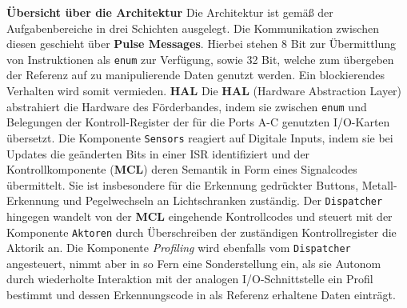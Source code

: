 \documentclass[
   draft=false
  ,paper=a4
  ,twoside=true
  ,fontsize=11pt
  ,headsepline
  ,DIV11
  ,parskip=full+
]{scrartcl} %
\begin{document}
\textbf{Übersicht über die Architektur} \newline
Die Architektur ist gemäß der Aufgabenbereiche in drei Schichten ausgelegt. Die Kommunikation zwischen diesen geschieht über \textbf{Pulse Messages}. Hierbei stehen 8 Bit zur Übermittlung von Instruktionen als \texttt{enum} zur Verfügung, sowie 32 Bit, welche zum übergeben der Referenz auf zu manipulierende Daten genutzt werden. Ein blockierendes Verhalten wird somit vermieden.
\newline
\newline
\textbf{HAL}\newline
Die \textbf{HAL} (Hardware Abstraction Layer) abstrahiert die Hardware des Förderbandes, indem sie zwischen \texttt{enum} und Belegungen der Kontroll-Register der für die Ports A-C genutzten I/O-Karten übersetzt. 
Die Komponente \texttt{Sensors} reagiert auf Digitale Inputs, indem sie bei Updates die geänderten Bits in einer ISR identifiziert und der Kontrollkomponente (\textbf{MCL}) deren Semantik in Form eines Signalcodes übermittelt. Sie ist insbesondere für die Erkennung gedrückter Buttons, Metall-Erkennung und Pegelwechseln an Lichtschranken zuständig.
Der \texttt{Dispatcher} hingegen wandelt von der \textbf{MCL} eingehende Kontrollcodes und steuert mit der Komponente \texttt{Aktoren} durch Überschreiben der zuständigen Kontrollregister die Aktorik an.
Die Komponente \emph{Profiling} wird ebenfalls vom \texttt{Dispatcher} angesteuert, nimmt aber in so Fern eine Sonderstellung ein, als sie Autonom durch wiederholte Interaktion mit der analogen I/O-Schnittstelle ein Profil bestimmt und dessen Erkennungscode in als Referenz erhaltene Daten einträgt.
\end{document}
